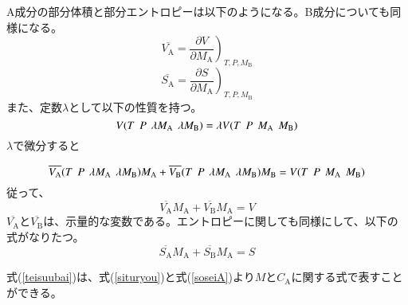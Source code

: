 \documentclass[a4paper,12pt, oneside, openany]{jsbook}
\begin{document}
A成分の部分体積と部分エントロピーは以下のようになる。B成分についても同様になる。
\begin{equation}
  \overline{V_\mathrm{A}}=\left.\frac{\partial V}{\partial M_\mathrm{A}}\right)_{T,P,M_\mathrm{B}}
\end{equation}
\begin{equation}
  \overline{S_\mathrm{A}}=\left.\frac{\partial S}{\partial M_\mathrm{A}}\right)_{T,P,M_\mathrm{B}}
\end{equation}
\noindent また、定数$\lambda$として以下の性質を持つ。
\begin{equation}\label{teisuubai}
  V(T\hspace{1.5mm}  P\hspace{1.5mm} \lambda M_\mathrm{A} \hspace{1.5mm}\lambda M_\mathrm{B})=\lambda V(T\hspace{1.5mm}  P\hspace{1.5mm}  M_\mathrm{A} \hspace{1.5mm} M_\mathrm{B})
\end{equation}
\noindent $\lambda$で微分すると

\begin{equation}
  \overline{V_\mathrm{A}}(T\hspace{1.5mm}  P\hspace{1.5mm} \lambda M_\mathrm{A} \hspace{1.5mm}\lambda M_\mathrm{B})M_\mathrm{A}+ \overline{V_\mathrm{B}}(T\hspace{1.5mm}  P\hspace{1.5mm} \lambda M_\mathrm{A} \hspace{1.5mm}\lambda M_\mathrm{B})M_\mathrm{B}=V(T\hspace{1.5mm}  P\hspace{1.5mm}  M_\mathrm{A} \hspace{1.5mm} M_\mathrm{B})
\end{equation}
\noindent 従って、
\begin{equation}\label{Vnituite}
  \overline{V_\mathrm{A}}M_\mathrm{A}+\overline{V_\mathrm{B}}M_\mathrm{A}=V
\end{equation}
\noindent$\overline{V_\mathrm{A}}$と$\overline{V_\mathrm{B}}$は、示量的な変数である。エントロピーに関しても同様にして、以下の式がなりたつ。
\begin{equation}
  \overline{S_\mathrm{A}}M_\mathrm{A}+\overline{S_\mathrm{B}}M_\mathrm{A}=S
\end{equation}

式(\ref{teisuubai})は、式(\ref{situryou})と式(\ref{soseiA})より$M$と$C_\mathrm{A}$に関する式で表すことができる。
\end{document}
